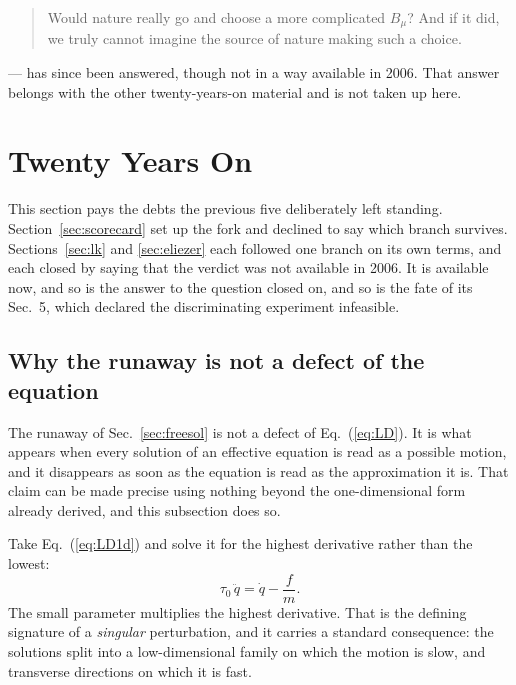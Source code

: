 \documentclass[preprint]{aastex701}
\newcommand{\taunought}{\tau_0}
\begin{document}
\begin{quote}
Would nature really go and choose a more complicated $B_\mu$? And if it did, we
truly cannot imagine the source of nature making such a choice.
\end{quote}

--- has since been answered, though not in a way available in 2006. That answer
belongs with the other twenty-years-on material and is not taken up here.

\section{Twenty Years On}
\label{sec:twentyyears}

This section pays the debts the previous five deliberately left standing.
Section~\ref{sec:scorecard} set up the fork and declined to say which branch
survives. Sections~\ref{sec:lk} and \ref{sec:eliezer} each followed one branch
on its own terms, and each closed by saying that the verdict was not available
in 2006. It is available now, and so is the answer to the question
\citet{zhang2006} closed on, and so is the fate of its Sec.~5, which declared
the discriminating experiment infeasible.

\subsection{Why the runaway is not a defect of the equation}
\label{sec:verdict}

The runaway of Sec.~\ref{sec:freesol} is not a defect of Eq.~(\ref{eq:LD}). It
is what appears when every solution of an effective equation is read as a
possible motion, and it disappears as soon as the equation is read as the
approximation it is. That claim can be made precise using nothing beyond the
one-dimensional form already derived, and this subsection does so.

Take Eq.~(\ref{eq:LD1d}) and solve it for the highest derivative rather than
the lowest:
\begin{equation}
\taunought\,\ddot q = \dot q - \frac{f}{m}.
\label{eq:singular}
\end{equation}
The small parameter multiplies the highest derivative. That is the defining
signature of a \emph{singular} perturbation, and it carries a standard
consequence: the solutions split into a low-dimensional family on which the
motion is slow, and transverse directions on which it is fast.
\end{document}
